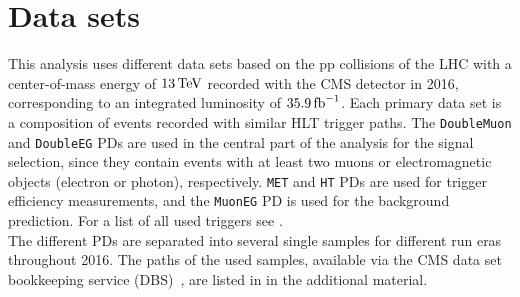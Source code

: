\section{Data sets}\label{sec:datasets}
This analysis uses different data sets based on the pp collisions of the LHC with a center-of-mass energy of $13\,\text{Te\hspace{-.08em}V}$ recorded with the CMS detector in 2016, corresponding to an integrated luminosity of $35.9\mbox{\ensuremath{\,\text{fb}^\text{$-$1}}}$. Each primary data set is a composition of events recorded with similar HLT trigger paths. The \texttt{DoubleMuon} and \texttt{DoubleEG} PDs are used in the central part of the analysis for the signal selection, since they contain events with at least two muons or electromagnetic objects (electron or photon), respectively. \texttt{MET} and \texttt{HT} PDs are used for trigger efficiency measurements, and the \texttt{MuonEG} PD is used for the background prediction. For a list of all used triggers see .\\
The different PDs are separated into several single samples for different run eras throughout 2016.
The paths of the used samples, available via the CMS data set bookkeeping service (DBS)~\cite{DASBookkeeping}, are listed in  in the additional material.




